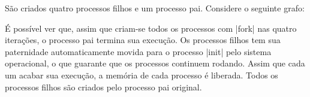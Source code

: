 \documentclass{amsart}
\theoremstyle{plain}
\begin{document}
São criados quatro processos filhos e um processo pai. Considere o seguinte grafo:

\begin{figure}[h]
\end{figure}

É possível ver que, assim que criam-se todos os processos com |fork| nas quatro
iterações, o processo pai termina sua execução. Os processos filhos tem sua paternidade
automaticamente movida para o processo |init| pelo sistema operacional, o que guarante
que os processos continuem rodando. Assim que cada um acabar sua execução, a memória de cada
processo é liberada. Todos os processos filhos são criados pelo processo pai original.
\end{document}
